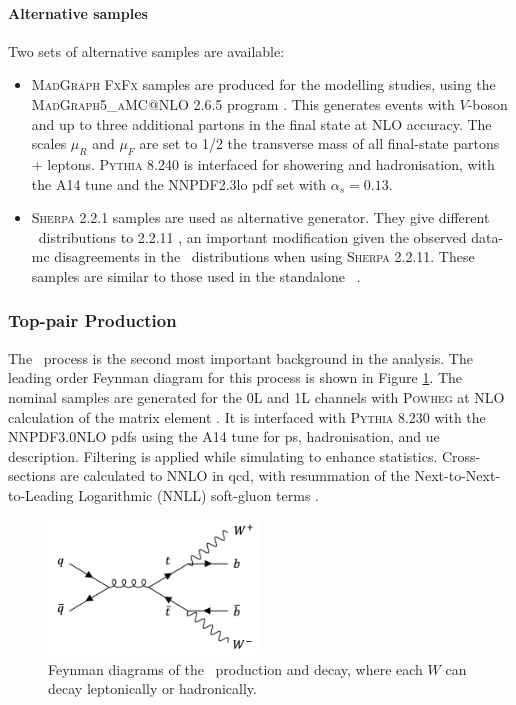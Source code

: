 \paragraph{Alternative samples} Two sets of alternative samples are available:
\begin{itemize}
  \item \textsc{MadGraph FxFx} samples are produced for the modelling studies, using the \textsc{MadGraph5\_aMC@NLO} 2.6.5 program \cite{madgraph}. This generates events with $V$-boson and up to three additional partons in the final state at NLO accuracy. The scales $\mu_R$ and $\mu_F$ are set to 1/2 the transverse mass of all final-state partons + leptons. \textsc{Pythia} 8.240 is interfaced for showering and hadronisation, with the A14 tune and the NNPDF2.3lo \gls{pdf} set with $\alpha_s = 0.13$.
  \item \textsc{Sherpa} 2.2.1 \cite{sherpa2.2paper} samples are used as alternative generator. They give different \ptv\ distributions to 2.2.11 \cite{simVjet}, an important modification given the observed data-\gls{mc} disagreements in the \ptv\ distributions when using \textsc{Sherpa} 2.2.11. These samples are similar to those used in the standalone \vhc\ \cite{Collaboration:2721696}.
\end{itemize}

\subsubsection{Top-pair Production}\label{subsec-vh-top-samples}
The \ttb\ process is the second most important background in the analysis. The leading order Feynman diagram for this process is shown in Figure \ref{fig:feynttb}. The nominal samples are generated for the 0L and 1L channels with \textsc{Powheg} at NLO calculation of the matrix element \cite{StefanoFrixione_2007, PaoloNason_2004}. It is interfaced with \textsc{Pythia} 8.230 with the NNPDF3.0NLO \glspl{pdf} using the A14 tune for \gls{ps}, hadronisation, and \gls{ue} description. Filtering is applied while simulating to enhance statistics. Cross-sections are calculated to NNLO in \gls{qcd}, with resummation of the Next-to-Next-to-Leading Logarithmic (NNLL) soft-gluon terms \cite{CZAKON20142930}.

\begin{figure}[h!]
  \center
  \includegraphics[width=0.5\textwidth]{Images/VH/Feynman/ttb.png}
  \caption{Feynman diagrams of the \ttb\ production and decay, where each $W$ can decay leptonically or hadronically.} 
  \label{fig:feynttb}
\end{figure}

